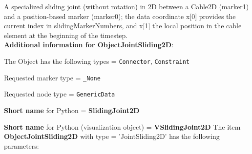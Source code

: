 \label{sec:item:ObjectJointSliding2D}
A specialized sliding joint (without rotation) in 2D between a Cable2D (marker1) and a position-based marker (marker0); the data coordinate x[0] provides the current index in slidingMarkerNumbers, and x[1] the local position in the cable element at the beginning of the timestep.\vspace{12pt}
 \\{\bf Additional information for ObjectJointSliding2D}:
\bi
  \item The Object has the following types = \texttt{Connector}, \texttt{Constraint}
  \item Requested marker type = \texttt{\_None}
  \item Requested node type = \texttt{GenericData}
  \item {\bf Short name} for Python = {\bf SlidingJoint2D}  \item {\bf Short name} for Python (visualization object) = {\bf VSlidingJoint2D}\ei
\vspace{12pt} \noindent The item {\bf ObjectJointSliding2D} with type = 'JointSliding2D' has the following parameters:\vspace{-1cm}\\ 
